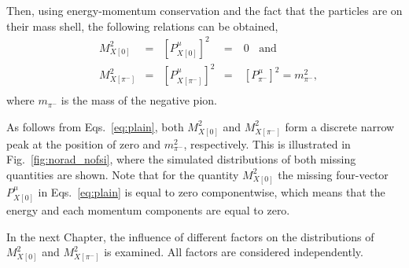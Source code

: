Then, using energy-momentum conservation and the fact that the particles are on their mass shell, the following relations can be obtained,
\begin{equation}
\begin{aligned}
&M_{X[0]}^{2}&=&\left [P_{X[0]}^{\mu} \right ]^{2}&=&~0~~~~\textrm{and}\\
&M_{X[\pi^{-}]}^{2}&=&\left [P_{X[\pi^{-}]}^{\mu}\right ]^{2}&=&~[P_{\pi^{-}}^{\mu}]^{2}=m_{\pi^{-}}^{2},\\
\end{aligned}\label{eq:plain}
\end{equation}
where $m_{\pi^{-}}$ is the mass of the negative pion.

As follows from Eqs.~\eqref{eq:plain}, both $M_{X[0]}^{2}$ and $M_{X[\pi^{-}]}^{2}$ form a discrete narrow peak at the position of zero and $m_{\pi^{-}}^{2}$, respectively. This is illustrated in Fig.~\ref{fig:norad_nofsi}, where the simulated distributions of both missing quantities are shown. Note that for the quantity $M_{X[0]}^{2}$ the missing four-vector $P_{X[0]}^{\mu}$ in Eqs.~\eqref{eq:plain} is equal to zero componentwise, which means that the energy and each momentum components are equal to zero.


In the next Chapter, the influence of different factors on the distributions of $M_{X[0]}^{2}$ and $M_{X[\pi^{-}]}^{2}$ is examined. All factors are considered independently.


